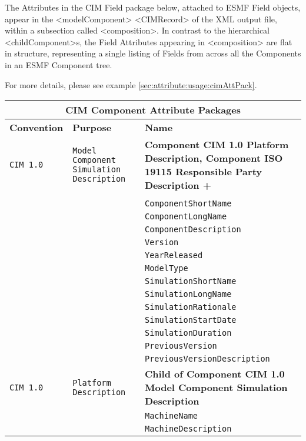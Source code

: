 The Attributes in the CIM Field package below, attached to ESMF Field objects, appear in the <modelComponent> <CIMRecord> of the XML output file, within a subsection called <composition>.  In contrast to the hierarchical <childComponent>s, the Field Attributes appearing in <composition> are flat in structure, representing a single listing of Fields from across all the Components in an ESMF Component tree.

For more details, please see example \ref{sec:attribute:usage:cimAttPack}.

\vspace{5pt}
\label{CIMComponentAttributePackages}
\begin{tabular}{|p{4cm}|p{4cm}|p{8cm}|}
\hline
\multicolumn{3}{|c|}{{\bf \large CIM Component Attribute Packages}} \\
\hline\hline
{\bf Convention} & {\bf Purpose} & {\bf Name} \\
\hline\hline
{\tt CIM 1.0} & {\tt Model Component Simulation Description} & {\bf Component CIM 1.0 Platform Description, \newline\newline \bf Component ISO 19115 Responsible Party Description +} \\
     & & \\
     & & {\tt ComponentShortName} \\
     & & {\tt ComponentLongName} \\
     & & {\tt ComponentDescription}  \\
     & & {\tt Version}  \\
     & & {\tt YearReleased} \\
     & & {\tt ModelType} \\
     & & {\tt SimulationShortName}\\
     & & {\tt SimulationLongName} \\ 
     & & {\tt SimulationRationale} \\
     & & {\tt SimulationStartDate} \\ 
     & & {\tt SimulationDuration} \\ 
     & & {\tt PreviousVersion} \\ 
     & & {\tt PreviousVersionDescription} \\ 
\hline
{\tt CIM 1.0} & {\tt Platform Description} & {\bf Child of Component CIM 1.0 Model Component Simulation Description}\\
     & & {\tt MachineName} \\
     & & {\tt MachineDescription} \\

\end{tabular}
